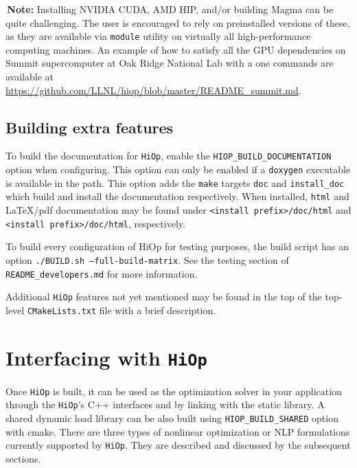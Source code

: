 \documentclass[11pt]{article}
\newcounter{line}
\newcommand{\warningSymbol}{\raisebox{0.9\depth}{\danger}}
\newcommand{\warningcp}[1]{%
        \smallskip \noindent \textcolor{warningColorText}{\warningSymbol{}}\,\textbf{#1} %
    }
\newcommand{\Hi}{\texttt{HiOp}\xspace}
\begin{document}
\warningcp{Note: } Installing NVIDIA CUDA, AMD HIP, and/or building Magma can be quite challenging. The user is encouraged to rely on preinstalled versions of these, as they are available via \texttt{module} utility on virtually all high-performance computing machines. An example of how to satisfy all the GPU dependencies on Summit supercomputer at Oak Ridge National Lab with a one commands are available at \url{https://github.com/LLNL/hiop/blob/master/README_summit.md}.

\subsection{Building extra features}

To build the documentation for \Hi, enable the 
\texttt{HIOP\_BUILD\_DOCUMENTATION} option when configuring. This option can 
only be enabled if a \texttt{doxygen} executable is available in the path. This 
option adds the \texttt{make} targets \texttt{doc} and \texttt{install\_doc} 
which build and install the documentation respectively. When installed, 
\texttt{html} and \LaTeX{}/pdf documentation may be found under 
\texttt{<install prefix>/doc/html} and \texttt{<install prefix>/doc/html}, 
respectively.

To build every configuration of HiOp for testing purposes, the build script has an option \texttt{./BUILD.sh --full-build-matrix}. See the testing section of \texttt{README\_developers.md} for more information.

Additional \Hi features not yet mentioned may be found in the top of the top-level \texttt{CMakeLists.txt} file with a brief description.

\section{Interfacing with \Hi}
Once \Hi is built, it can be used as the optimization solver in your application through the \Hi's C++ interfaces and by linking with the static library. A shared dynamic load library can be also built using \texttt{HIOP\_BUILD\_SHARED} option with cmake. There are three types of nonlinear optimization or NLP formulations currently supported by \Hi. They are described and discussed by the subsequent sections.
\end{document}

